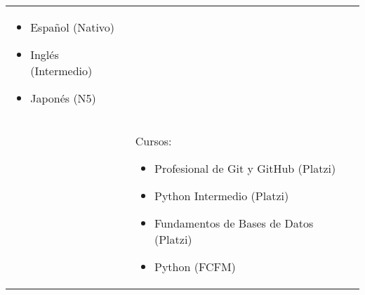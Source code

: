 \documentclass[twoside,letter,openright,10pt]{report}
\begin{document}
\begin{table}[hbt!]
\begin{tabular}{p{40mm}p{140mm}}
\begin{itemize}[noitemsep,nolistsep]
\item Español (Nativo)
\item Inglés (Intermedio)
\item Japonés (N5)
\vspace{-4mm}
\end{itemize}
\\
& Cursos:
\begin{itemize}[noitemsep,nolistsep]
\item Profesional de Git y GitHub (Platzi)
\item Python Intermedio (Platzi)
\item Fundamentos de Bases de Datos (Platzi)
\item Python (FCFM)
\vspace{-4mm}
\end{itemize}
\end{tabular}
\end{table}
\end{document}
